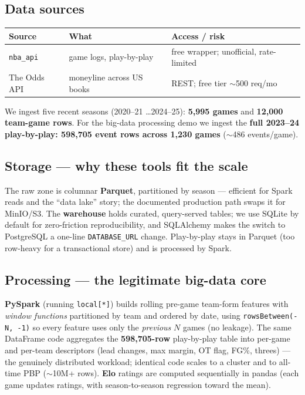\documentclass[12pt]{article}
\begin{document}
\subsection{Data sources}
\begin{center}\small
\begin{tabular}{@{}lll@{}}
\toprule
\textbf{Source} & \textbf{What} & \textbf{Access / risk} \\
\midrule
\texttt{nba\_api} & game logs, play-by-play & free wrapper; unofficial, rate-limited \\
The Odds API & moneyline across US books & REST; free tier $\sim$500 req/mo \\
\bottomrule
\end{tabular}
\end{center}
\noindent We ingest five recent seasons (2020--21 \dots 2024--25): \textbf{5{,}995 games} and
\textbf{12{,}000 team-game rows}. For the big-data processing demo we ingest the
\textbf{full 2023--24 play-by-play: 598{,}705 event rows across 1{,}230 games}
($\sim$486 events/game).

\subsection{Storage --- why these tools fit the scale}
The raw zone is columnar \textbf{Parquet}, partitioned by season --- efficient for Spark reads
and the ``data lake'' story; the documented production path swaps it for MinIO/S3. The
\textbf{warehouse} holds curated, query-served tables; we use SQLite by default for
zero-friction reproducibility, and SQLAlchemy makes the switch to PostgreSQL a one-line
\texttt{DATABASE\_URL} change. Play-by-play stays in Parquet (too row-heavy for a transactional
store) and is processed by Spark.

\subsection{Processing --- the legitimate big-data core}
\textbf{PySpark} (running \texttt{local[*]}) builds rolling pre-game team-form features with
\emph{window functions} partitioned by team and ordered by date, using
\texttt{rowsBetween(-N,\,-1)} so every feature uses only the \emph{previous} $N$ games
(no leakage). The same DataFrame code aggregates the \textbf{598{,}705-row} play-by-play table
into per-game and per-team descriptors (lead changes, max margin, OT flag, FG\%, threes)
--- the genuinely distributed workload; identical code scales to a cluster and to all-time PBP
($\sim$10M+ rows). \textbf{Elo} ratings are computed sequentially in pandas (each game updates
ratings, with season-to-season regression toward the mean).
\end{document}
